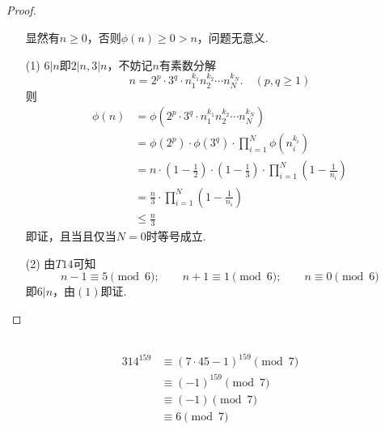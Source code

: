 \documentclass[UTF8]{ctexart}
\begin{document}
\subsection{}   %
\begin{proof}
    \begin{enumerate}
        \item []
        \item []显然有$n\geq 0$，否则$\phi (n) \geq 0 > n$，问题无意义.
        \item [(1)]$6|n$即$2|n,3|n$，不妨记$n$有素数分解
        \[
            n=2^{p}\cdot 3^{q} \cdot n_1^{k_1} n_2^{k_2} \cdots n_N^{k_N}.
            \quad
            (p,q \geq 1)
        \]
        则
        \begin{align*}
            \phi (n) 
            & = \phi (2^{p} \cdot 3^{q}\cdot n_1^{k_1} n_2^{k_2} \cdots n_N^{k_N}) \\
            & = \phi (2^{p})\cdot \phi (3^{q}) \cdot \prod\limits_{i=1}^{N} \phi (n_i^{k_i})\\
            & = n \cdot \displaystyle{\left(1-\frac{1}{2} \right) \cdot \left(1-\frac{1}{3}\right)\cdot \prod_{i=1}^{N} \left(1-\frac{1}{n_i}\right) }\\
            & = \displaystyle{\frac{n}{3} \cdot \prod_{i=1}^{N} \left(1-\frac{1}{n_i}\right)}\\
            & \leq \displaystyle{\frac{n}{3}}
        \end{align*}
        即证，且当且仅当$N=0$时等号成立.
        \item [(2)]由$T14$可知
        \[
            n-1 \equiv 5 \pmod{6} ; 
            \qquad
            n+1 \equiv 1 \pmod{6} ;
            \qquad
            n \equiv 0 \pmod{6}
        \]
        即$6|n$，由$(1)$即证.
    \end{enumerate}
\end{proof}

\subsection{}   %


\subsection{}   %
\begin{align*}
    {314}^{159} 
    & \equiv {(7\cdot 45 - 1)}^{159} \pmod{7}\\
    & \equiv {(-1)}^{159} \pmod{7}\\
    & \equiv (-1) \pmod{7}\\
    & \equiv 6 \pmod{7}
\end{align*}
\end{document}
